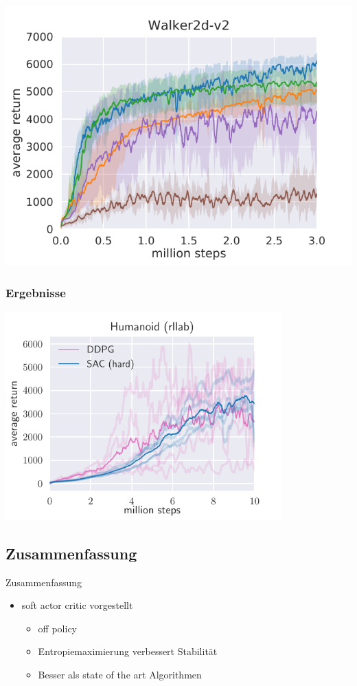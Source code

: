 \begin{frame}
    \includegraphics[width=.3\textwidth]{figures/walker.pdf}\hfill
    
\end{frame}

\begin{frame}
    \frametitle{Ergebnisse}
    \includegraphics[width=0.8\textwidth]{figures/seeds-humanoid.pdf}
\end{frame}


\subsection{Zusammenfassung}
\begin{frame}{Zusammenfassung}
        \begin{itemize}
            \item soft actor critic vorgestellt
            \begin{itemize}
                \item off policy
                \item Entropiemaximierung verbessert Stabilität
                \item Besser als state of the art Algorithmen 
            \end{itemize} 
        \end{itemize}
\end{frame}

